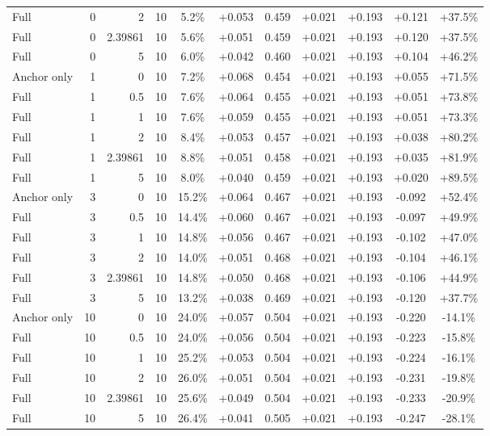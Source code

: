 \begin{table}[htbp]
\begin{tabular}{lrrrccccccc}
Full & 0 & 2 & 10 & 5.2\% & +0.053 & 0.459 & +0.021 & +0.193 & +0.121 & +37.5\% \\
Full & 0 & 2.39861 & 10 & 5.6\% & +0.051 & 0.459 & +0.021 & +0.193 & +0.120 & +37.5\% \\
Full & 0 & 5 & 10 & 6.0\% & +0.042 & 0.460 & +0.021 & +0.193 & +0.104 & +46.2\% \\
Anchor only & 1 & 0 & 10 & 7.2\% & +0.068 & 0.454 & +0.021 & +0.193 & +0.055 & +71.5\% \\
Full & 1 & 0.5 & 10 & 7.6\% & +0.064 & 0.455 & +0.021 & +0.193 & +0.051 & +73.8\% \\
Full & 1 & 1 & 10 & 7.6\% & +0.059 & 0.455 & +0.021 & +0.193 & +0.051 & +73.3\% \\
Full & 1 & 2 & 10 & 8.4\% & +0.053 & 0.457 & +0.021 & +0.193 & +0.038 & +80.2\% \\
Full & 1 & 2.39861 & 10 & 8.8\% & +0.051 & 0.458 & +0.021 & +0.193 & +0.035 & +81.9\% \\
Full & 1 & 5 & 10 & 8.0\% & +0.040 & 0.459 & +0.021 & +0.193 & +0.020 & +89.5\% \\
Anchor only & 3 & 0 & 10 & 15.2\% & +0.064 & 0.467 & +0.021 & +0.193 & -0.092 & +52.4\% \\
Full & 3 & 0.5 & 10 & 14.4\% & +0.060 & 0.467 & +0.021 & +0.193 & -0.097 & +49.9\% \\
Full & 3 & 1 & 10 & 14.8\% & +0.056 & 0.467 & +0.021 & +0.193 & -0.102 & +47.0\% \\
Full & 3 & 2 & 10 & 14.0\% & +0.051 & 0.468 & +0.021 & +0.193 & -0.104 & +46.1\% \\
Full & 3 & 2.39861 & 10 & 14.8\% & +0.050 & 0.468 & +0.021 & +0.193 & -0.106 & +44.9\% \\
Full & 3 & 5 & 10 & 13.2\% & +0.038 & 0.469 & +0.021 & +0.193 & -0.120 & +37.7\% \\
Anchor only & 10 & 0 & 10 & 24.0\% & +0.057 & 0.504 & +0.021 & +0.193 & -0.220 & -14.1\% \\
Full & 10 & 0.5 & 10 & 24.0\% & +0.056 & 0.504 & +0.021 & +0.193 & -0.223 & -15.8\% \\
Full & 10 & 1 & 10 & 25.2\% & +0.053 & 0.504 & +0.021 & +0.193 & -0.224 & -16.1\% \\
Full & 10 & 2 & 10 & 26.0\% & +0.051 & 0.504 & +0.021 & +0.193 & -0.231 & -19.8\% \\
Full & 10 & 2.39861 & 10 & 25.6\% & +0.049 & 0.504 & +0.021 & +0.193 & -0.233 & -20.9\% \\
Full & 10 & 5 & 10 & 26.4\% & +0.041 & 0.505 & +0.021 & +0.193 & -0.247 & -28.1\% \\

\end{tabular}
\end{table}
